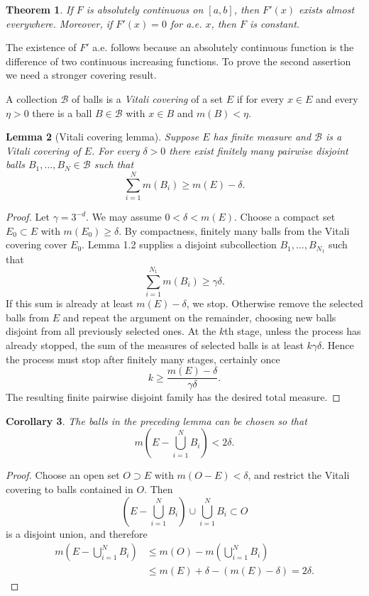 \documentclass[11pt,openany]{book}
\newtheorem{theorem}{Theorem}[section]
\newtheorem{lemma}[theorem]{Lemma}
\newtheorem{corollary}[theorem]{Corollary}
\begin{document}
\begin{theorem}
If $F$ is absolutely continuous on $[a,b]$, then $F'(x)$ exists almost everywhere. Moreover, if $F'(x)=0$ for a.e. $x$, then $F$ is constant.
\end{theorem}

The existence of $F'$ a.e. follows because an absolutely continuous function is the difference of two continuous increasing functions. To prove the second assertion we need a stronger covering result.

A collection $\mathcal B$ of balls is a \emph{Vitali covering} of a set $E$ if for every $x\in E$ and every $\eta>0$ there is a ball $B\in\mathcal B$ with $x\in B$ and $m(B)<\eta$.

\begin{lemma}[Vitali covering lemma]
Suppose $E$ has finite measure and $\mathcal B$ is a Vitali covering of $E$. For every $\delta>0$ there exist finitely many pairwise disjoint balls $B_1,\ldots,B_N\in\mathcal B$ such that
\[
\sum_{i=1}^Nm(B_i)\ge m(E)-\delta.
\]
\end{lemma}

\begin{proof}
Let $\gamma=3^{-d}$. We may assume $0<\delta<m(E)$. Choose a compact set $E_0\subset E$ with $m(E_0)\ge\delta$. By compactness, finitely many balls from the Vitali covering cover $E_0$. Lemma 1.2 supplies a disjoint subcollection $B_1,\ldots,B_{N_1}$ such that
\[
\sum_{i=1}^{N_1}m(B_i)\ge\gamma\delta.
\]
If this sum is already at least $m(E)-\delta$, we stop. Otherwise remove the selected balls from $E$ and repeat the argument on the remainder, choosing new balls disjoint from all previously selected ones. At the $k$th stage, unless the process has already stopped, the sum of the measures of selected balls is at least $k\gamma\delta$. Hence the process must stop after finitely many stages, certainly once
\[
k\ge\frac{m(E)-\delta}{\gamma\delta}.
\]
The resulting finite pairwise disjoint family has the desired total measure.
\end{proof}

\begin{corollary}
The balls in the preceding lemma can be chosen so that
\[
m\left(E-\bigcup_{i=1}^NB_i\right)<2\delta.
\]
\end{corollary}

\begin{proof}
Choose an open set $O\supset E$ with $m(O-E)<\delta$, and restrict the Vitali covering to balls contained in $O$. Then
\[
\left(E-\bigcup_{i=1}^NB_i\right)\cup\bigcup_{i=1}^NB_i\subset O
\]
is a disjoint union, and therefore
\begin{align*}
m\left(E-\bigcup_{i=1}^NB_i\right)
&\le m(O)-m\left(\bigcup_{i=1}^NB_i\right)\\
&\le m(E)+\delta-(m(E)-\delta)=2\delta.
\end{align*}
\end{proof}
\end{document}
